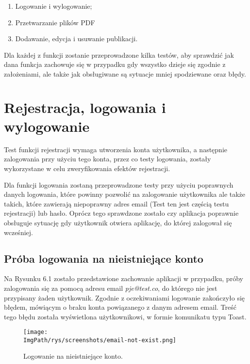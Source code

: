 \documentclass[a4paper,12pt,twoside,openany]{report}
\newcommand{\ImgPath}{.}
\begin{document}
\begin{enumerate}
	\item Logowanie i wylogowanie;
	\item Przetwarzanie plików PDF
	\item Dodawanie, edycja i usuwanie publikacji.
\end{enumerate}

Dla każdej z funkcji zostanie przeprowadzone kilka testów, aby sprawdzić jak dana funkcja zachowuje się w przypadku gdy wszystko dzieje się zgodnie z założeniami, ale także jak obsługiwane są sytuacje mniej spodziewane oraz błędy. 

\section{Rejestracja, logowania i wylogowanie}
Test funkcji rejestracji wymaga utworzenia konta użytkownika, a następnie zalogowania przy użyciu tego konta, przez co testy logowania, zostały wykorzystane w celu zweryfikowania efektów rejestracji.  

Dla funkcji logowania zostaną przeprowadzone testy przy użyciu poprawnych danych logowania, które powinny pozwolić na zalogowanie użytkownika ale także takich, które zawierają niepoprawny adres email (Test ten jest częścią testu rejestracji) lub hasło. Oprócz tego sprawdzone zostało czy aplikacja poprawnie obsługuje sytuację gdy użytkownik otwiera aplikację, do której zalogował się wcześniej.


\pagebreak


\subsection{Próba logowania na nieistniejące konto}
Na Rysunku 6.1 zostało przedstawione zachowanie aplikacji w przypadku, próby zalogowania się za pomocą adresu email \textit{pje@test.co}, do którego nie jest przypisany żaden użytkownik. Zgodnie z oczekiwaniami logowanie zakończyło się błędem, mówiącym o braku konta powiązanego z danym adresem email. Treść tego błędu została wyświetlona użytkownikowi, w formie komunikatu typu Toast.
\begin{figure}[!htbp]
	\begin{center}
		\centering
		\texttt{[image: \\ImgPath/rys/screenshots/email-not-exist.png]}
	\end{center}
	\caption{Logowanie na nieistniejące konto.}
	\label{zrzutLogowaniePoprawne}
\end{figure}
\end{document}
